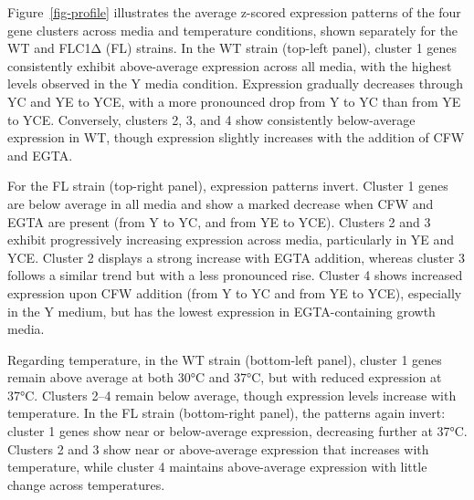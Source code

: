 \documentclass[
  a4paper,
]{scrreprt}
\begin{document}
Figure~\ref{fig-profile} illustrates the average z-scored expression
patterns of the four gene clusters across media and temperature
conditions, shown separately for the WT and FLC1Δ (FL) strains. In the
WT strain (top-left panel), cluster 1 genes consistently exhibit
above-average expression across all media, with the highest levels
observed in the Y media condition. Expression gradually decreases
through YC and YE to YCE, with a more pronounced drop from Y to YC than
from YE to YCE. Conversely, clusters 2, 3, and 4 show consistently
below-average expression in WT, though expression slightly increases
with the addition of CFW and EGTA.

For the FL strain (top-right panel), expression patterns invert. Cluster
1 genes are below average in all media and show a marked decrease when
CFW and EGTA are present (from Y to YC, and from YE to YCE). Clusters 2
and 3 exhibit progressively increasing expression across media,
particularly in YE and YCE. Cluster 2 displays a strong increase with
EGTA addition, whereas cluster 3 follows a similar trend but with a less
pronounced rise. Cluster 4 shows increased expression upon CFW addition
(from Y to YC and from YE to YCE), especially in the Y medium, but has
the lowest expression in EGTA-containing growth media.

Regarding temperature, in the WT strain (bottom-left panel), cluster 1
genes remain above average at both 30°C and 37°C, but with reduced
expression at 37°C. Clusters 2--4 remain below average, though
expression levels increase with temperature. In the FL strain
(bottom-right panel), the patterns again invert: cluster 1 genes show
near or below-average expression, decreasing further at 37°C. Clusters 2
and 3 show near or above-average expression that increases with
temperature, while cluster 4 maintains above-average expression with
little change across temperatures.
\end{document}
